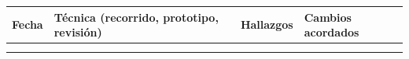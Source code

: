 {\def\LTcaptype{none} %
\begin{longtable}[]{@{}
  >{\raggedright\arraybackslash}p{}
  >{\raggedright\arraybackslash}p{}
  >{\raggedright\arraybackslash}p{}
  >{\raggedright\arraybackslash}p{}@{}}
\toprule\noalign{}
\begin{minipage}[b]{\linewidth}\raggedright
\textbf{Fecha}
\end{minipage} & \begin{minipage}[b]{\linewidth}\raggedright
\textbf{Técnica (recorrido, prototipo, revisión)}
\end{minipage} & \begin{minipage}[b]{\linewidth}\raggedright
\textbf{Hallazgos}
\end{minipage} & \begin{minipage}[b]{\linewidth}\raggedright
\textbf{Cambios acordados}
\end{minipage} \\
\midrule\noalign{}
\endhead
\bottomrule\noalign{}
\endlastfoot
& & & \\
& & & \\
\end{longtable}
}
